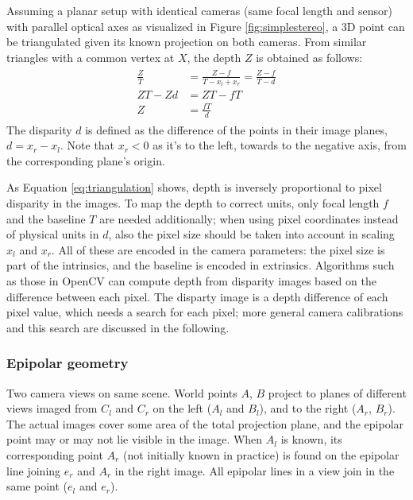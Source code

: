Assuming a planar setup with identical cameras (same focal length and sensor) with parallel optical axes as visualized in Figure \ref{fig:simplestereo}, a 3D point can be triangulated given its known projection on both cameras.
From similar triangles with a common vertex at $X$, the depth $Z$ is obtained as follows:
\begin{align} \label{eq:triangulation} \begin{split}
	\frac{Z}{T} &= \frac{Z-f}{T - x_l + x_r} = \frac{Z-f}{T - d}\\
	ZT - Zd &= ZT - fT\\
	Z &= \frac{fT}{d}
\end{split} \end{align}
The disparity $d$ is defined as the difference of the points in their image planes, $d = x_r - x_l$.
Note that $x_r < 0$ as it's to the left, towards to the negative axis, from the corresponding plane's origin.

As Equation \ref{eq:triangulation} shows, depth is inversely proportional to pixel disparity in the images.
To map the depth to correct units, only focal length $f$ and the baseline $T$ are needed additionally; when using pixel coordinates instead of physical units in $d$, also the pixel size should be taken into account in scaling $x_l$ and $x_r$.
All of these are encoded in the camera parameters: the pixel size is part of the intrinsics, and the baseline is encoded in extrinsics.
Algorithms such as those in OpenCV \cite{opencv} can compute depth from disparity images based on the difference between each pixel.
The disparty image is a depth difference of each pixel value, which needs a search for each pixel;
more general camera calibrations and this search are discussed in the following.


\subsubsection{Epipolar geometry} %

{Two camera views on same scene.
World points $A$, $B$ project to planes of different views imaged from $C_l$ and $C_r$ on the left ($A_l$ and $B_l$), and to the right ($A_r$, $B_r$).
The actual images cover some area of the total projection plane, and the epipolar point may or may not lie visible in the image.
When $A_l$ is known, its corresponding point $A_r$ (not initially known in practice) is found on the epipolar line joining $e_r$ and $A_r$ in the right image.
All epipolar lines in a view join in the same point ($e_l$ and $e_r$).}

